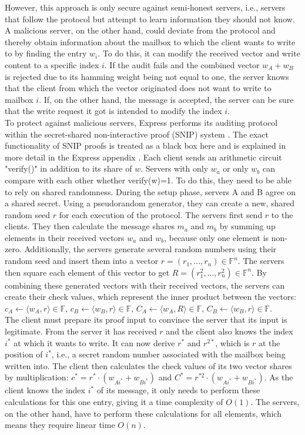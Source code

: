 \documentclass[a4paper]{article}
\begin{document}
However, this approach is only secure against semi-honest servers, i.e., servers that follow the protocol but attempt to learn information they should not know. A malicious server, on the other hand, could deviate from the protocol and thereby obtain information about the mailbox to which the client wants to write to by finding the entry $w_i$. To do this, it can modify the received vector and write content to a specific index $i$. If the audit fails and the combined vector $w_A + w_B$ is rejected due to its hamming weight being not equal to one, the server knows that the client from which the vector originated does not want to write to mailbox $i$. If, on the other hand, the message is accepted, the server can be sure that the write request it got is intended to modify the index $i$. \\
To protect against malicious servers, Express performs its auditing protocol within the secret-shared non-interactive proof (SNIP) system \citep{Prio2017}. The exact functionality of SNIP proofs is treated as a black box here and is explained in more detail in the Express appendix \citep{Eskandarian2021}. Each client sends an arithmetic circuit "verify()" in addition to its share of $w$. Servers with only $w_a$ or only $w_b$ can compare with each other whether verify(w)=1. To do this, they need to be able to rely on shared randomness. During the setup phase, servers A and B agree on a shared secret. Using a pseudorandom generator, they can create a new, shared random seed $r$ for each execution of the protocol. The servers first send $r$ to the clients. They then calculate the message shares $m_a$ and $m_b$ by summing up elements in their received vectors $w_a$ and $w_b$, because only one element is non-zero. Additionally, the servers generate several random numbers using their random seed and insert them into a vector $r = (r_1,...,r_n) \in \mathbb{F}^n$. The servers then square each element of this vector to get $R=(r_1^2,...,r_n^2) \in \mathbb{F}^n$. By combining these generated vectors with their received vectors, the servers can create their check values, which represent the inner product between the vectors: $c_A \leftarrow \langle w_A, r \rangle \in \mathbb{F}$, $c_B \leftarrow \langle w_B, r \rangle \in \mathbb{F}$, $C_A \leftarrow \langle w_A, R \rangle \in \mathbb{F}$, $C_B \leftarrow \langle w_B, r \rangle \in \mathbb{F}$. \\
The client must prepare its proof input to convince the server that its input is legitimate. From the server it has received $r$ and the client also knows the index $i^*$ at which it wants to write. It can now derive $r^*$ and $r^{2*}$, which is $r$ at the position of $i^*$, i.e., a secret random number associated with the mailbox being written into. The client then calculates the check values of its two vector shares by multiplication: $c^* = r^* \cdot (w_{Ai^*}+w_{Bi^*})$ and $C^* = r^{*2} \cdot (w_{Ai^*}+w_{Bi^*})$. As the client knows the index $i^*$ of its message, it only needs to perform these calculations for this one entry, giving it a  time complexity of $O(1)$. The servers, on the other hand, have to perform these calculations for all elements, which means they require linear time $O(n)$. \\
\end{document}
